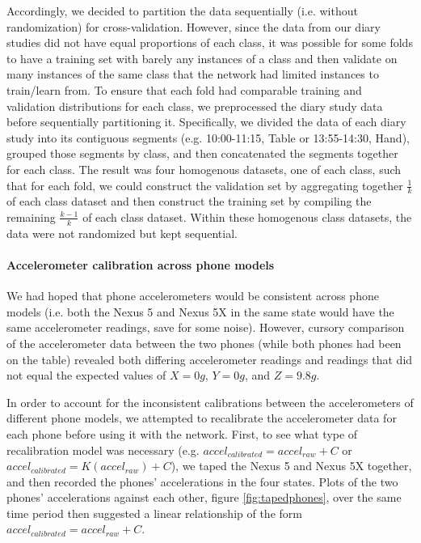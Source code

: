 Accordingly, we decided to partition the data sequentially (i.e. without randomization)
for cross-validation. However, since the data from our diary studies
did not have equal proportions of each class, it was possible for some folds
to have a training set with barely any instances of a class and then validate
on many instances of the same class that the network had limited instances
to train/learn from. To ensure that each fold had comparable training and validation distributions 
for each class, we preprocessed the diary study data before sequentially partitioning it. 
Specifically, we divided the data of each diary study into its 
contiguous segments (e.g. 10:00-11:15, Table or 13:55-14:30, Hand), grouped 
those segments by class, and then concatenated the segments together for each class. The result was four 
homogenous datasets, one of each class, such that for each fold, we could construct
the validation set by aggregating together $\frac{1}{k}$ of each class dataset and then
construct the training set by compiling the remaining $\frac{k - 1}{k}$ of each class dataset.
Within these homogenous class datasets, the data were not randomized but 
kept sequential.

\paragraph{Accelerometer calibration across phone models}
We had hoped that phone accelerometers would be consistent across phone models (i.e.
both the Nexus 5 and Nexus 5X in the same state would have the same accelerometer
readings, save for some noise). However, cursory comparison of the accelerometer data between the two phones 
(while both phones had been on the table) revealed both differing accelerometer readings and readings
that did not equal the expected values of $X = 0g$, $Y = 0g$, and $Z = 9.8g$. 




In order to account for the inconsistent calibrations between the accelerometers of different phone models, we
attempted to recalibrate the accelerometer data for each phone before using it with the network. 
First, to see what type of recalibration model was necessary (e.g. $accel_{calibrated} = accel_{raw} + C$ or
$accel_{calibrated} = K(accel_{raw}) + C$), we taped the Nexus 5 and Nexus 5X together, and then recorded
the phones' accelerations in the four states. Plots of the two phones' accelerations against each other, figure \ref{fig:tapedphones}, over the same time period
then suggested a linear relationship of the form $accel_{calibrated} = accel_{raw} + C$. 

